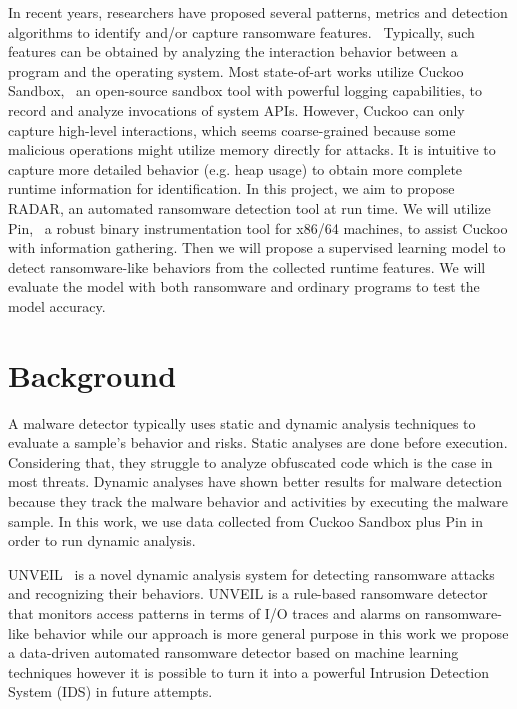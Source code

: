 \documentclass[letterpaper,twocolumn,10pt]{article}
\newcommand{\work}{\mbox{\textsc{RADAR}}\xspace}
\begin{document}
In recent years, researchers have proposed several patterns, metrics and detection algorithms to identify and/or capture ransomware features.~\cite{Chen2019AutomatedRB, 8051108, Morat2018RansomwareED, Verma2018DefiningAM}
Typically, such features can be obtained by analyzing the interaction behavior between a program and the operating system.
Most state-of-art works utilize Cuckoo Sandbox,~\cite{CuckooSS} an open-source sandbox tool with powerful logging capabilities, to record and analyze invocations of system APIs.
However, Cuckoo can only capture high-level interactions, which seems coarse-grained because some malicious operations might utilize memory directly for attacks.
It is intuitive to capture more detailed behavior (e.g. heap usage) to obtain more complete runtime information for identification.
In this project, we aim to propose \work, an automated ransomware detection tool at run time.
We will utilize Pin,~\cite{pin} a robust binary instrumentation tool for x86/64 machines, to assist Cuckoo with information gathering.
Then we will propose a supervised learning model to detect ransomware-like behaviors from the collected runtime features.
We will evaluate the model with both ransomware and ordinary programs to test the model accuracy.

\section{Background}

A malware detector typically uses static and dynamic analysis techniques to evaluate a sample's behavior and risks. Static analyses are done before execution. Considering that, they struggle to analyze obfuscated code which is the case in most threats. Dynamic analyses have shown better results for malware detection because they track the malware behavior and activities by executing the malware sample. In this work, we use data collected from Cuckoo Sandbox plus Pin in order to run dynamic analysis. 

UNVEIL~\cite{197235} is a novel dynamic analysis system for detecting ransomware attacks and recognizing their behaviors. UNVEIL is a rule-based ransomware detector that monitors access patterns in terms of I/O traces and alarms on ransomware-like behavior while our approach is more general purpose in this work we propose a data-driven automated ransomware detector based on machine learning techniques however it is possible to turn it into a powerful Intrusion Detection System (IDS) in future attempts.
\end{document}
